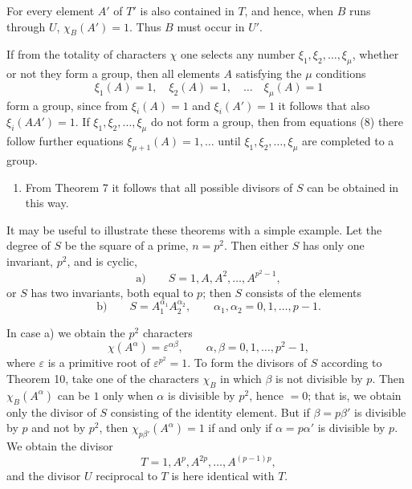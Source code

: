 \documentclass[11pt]{article}
\begin{document}
For every element $A'$ of $T'$ is also contained in $T$, and hence, when $B$ runs through $U$, $\chi_B(A')=1$. Thus $B$ must occur in $U'$.

If from the totality of characters $\chi$ one selects any number $\xi_1,\xi_2,
\ldots,
\xi_\mu$, whether or not they form a group, then all elements $A$ satisfying the $\mu$ conditions
\begin{equation}
\xi_1(A)=1,
\quad \xi_2(A)=1,
\quad\ldots\quad
\xi_\mu(A)=1
\tag{8}
\end{equation}
form a group, since from $\xi_i(A)=1$ and $\xi_i(A')=1$ it follows that also $\xi_i(AA')=1$. If $\xi_1,\xi_2,
\ldots,
\xi_\mu$ do not form a group, then from equations (8) there follow further equations $\xi_{\mu+1}(A)=1,
\ldots$ until $\xi_1,\xi_2,
\ldots,
\xi_\mu$ are completed to a group.

\begin{enumerate}[resume,label=\arabic*.]
\item From Theorem 7 it follows that all possible divisors of $S$ can be obtained in this way.
\end{enumerate}

It may be useful to illustrate these theorems with a simple example. Let the degree of $S$ be the square of a prime, $n=p^2$. Then either $S$ has only one invariant, $p^2$, and is cyclic,
\begin{equation*}
\text{a)}\qquad S=1,A,A^2,
\ldots,A^{p^2-1},
\end{equation*}
or $S$ has two invariants, both equal to $p$; then $S$ consists of the elements
\begin{equation*}
\text{b)}\qquad S=A_1^{\alpha_1}A_2^{\alpha_2},
\qquad \alpha_1,\alpha_2=0,1,\ldots,p-1.
\end{equation*}

In case a) we obtain the $p^2$ characters
\[
\chi(A^\alpha)=\varepsilon^{\alpha\beta},
\qquad \alpha,
\beta=0,1,
\ldots,p^2-1,
\]
where $\varepsilon$ is a primitive root of $\varepsilon^{p^2}=1$. To form the divisors of $S$ according to Theorem 10, take one of the characters $\chi_B$ in which $\beta$ is not divisible by $p$. Then $\chi_B(A^\alpha)$ can be $1$ only when $\alpha$ is divisible by $p^2$, hence $=0$; that is, we obtain only the divisor of $S$ consisting of the identity element. But if $\beta=p\beta'$ is divisible by $p$ and not by $p^2$, then $\chi_{p\beta'}(A^\alpha)=1$ if and only if $\alpha=p\alpha'$ is divisible by $p$. We obtain the divisor
\[
T=1,A^p,A^{2p},
\ldots,A^{(p-1)p},
\]
and the divisor $U$ reciprocal to $T$ is here identical with $T$.
\end{document}

